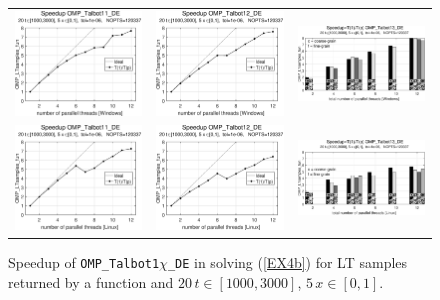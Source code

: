 \documentclass[a4paper,10pt]{report}%
\begin{document}
\begin{figure}[htb]
\centering
\begin{tabular}{ccc} %
\includegraphics[height=0.2\textwidth]{./FIGS/EX4b/EX4b_fun_speedup_11_20t_1000_Windows.eps} &
\includegraphics[height=0.2\textwidth]{./FIGS/EX4b/EX4b_fun_speedup_12_20t_1000_Windows.eps} &
\includegraphics[height=0.2\textwidth,keepaspectratio=true]{./FIGS/EX4b/EX4b_fun_speedup_13_20t_1000_Windows.eps} \\
\includegraphics[height=0.2\textwidth]{./FIGS/EX4b/EX4b_fun_speedup_11_20t_1000_Linux.eps} &
\includegraphics[height=0.2\textwidth]{./FIGS/EX4b/EX4b_fun_speedup_12_20t_1000_Linux.eps} &
\includegraphics[height=0.2\textwidth,keepaspectratio=true]{./FIGS/EX4b/EX4b_fun_speedup_13_20t_1000_Linux.eps}
\end{tabular}
\caption{\small Speedup of {\tt OMP\_Talbot1$\chi$\_DE} in solving (\ref{EX4b}) for LT samples returned
by a function and $20\,t\in[1000,3000]$, $5\,x\in[0,1]$.}
\label{PAR_EX4b_speedup_fun5}
\end{figure}
\end{document}

